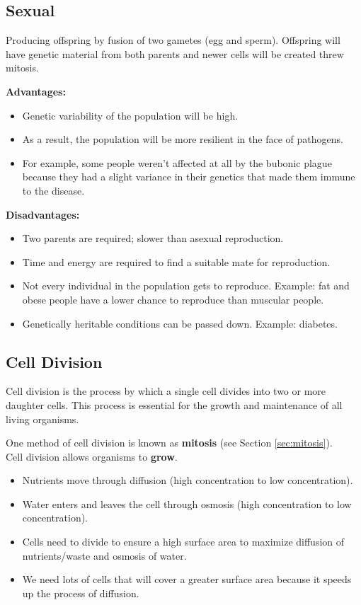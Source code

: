 \documentclass[12pt]{report}
\begin{document}
\subsection{Sexual}
\begin{definition}[Sexual]
    Producing offspring by fusion of two gametes (egg and sperm). Offspring will have genetic material from both parents and newer cells will be created threw mitosis.
\end{definition}

\textbf{Advantages:}
\begin{itemize}
    \item{Genetic variability of the population will be high.}
    \item{As a result, the population will be more resilient in the face of pathogens.}
    \item{For example, some people weren't affected at all by the bubonic plague because they had a slight variance in their genetics that made them immune to the disease.}
\end{itemize}

\textbf{Disadvantages:}
\begin{itemize}
    \item{Two parents are required; slower than asexual reproduction.}
    \item{Time and energy are required to find a suitable mate for reproduction.}
    \item{Not every individual in the population gets to reproduce. Example: fat and obese people have a lower chance to reproduce than muscular people.}
    \item{Genetically heritable conditions can be passed down. Example: diabetes.}
\end{itemize}

\subsection{Cell Division}
\begin{definition}
    Cell division is the process by which a single cell divides into two or more daughter cells. This process is essential for the growth and maintenance of all living organisms.
\end{definition}

One method of cell division is known as \textbf{mitosis} (see Section \ref{sec:mitosis}).\\

Cell division allows organisms to \textbf{grow}. 
\begin{itemize}
    \item{Nutrients move through diffusion (high concentration to low concentration).}
    \item{Water enters and leaves the cell through osmosis (high concentration to low concentration).}
    \item{Cells need to divide to ensure a high surface area to maximize diffusion of nutrients/waste and osmosis of water.}
    \item{We need lots of cells that will cover a greater surface area because it speeds up the process of diffusion.}
\end{itemize}
\end{document}
